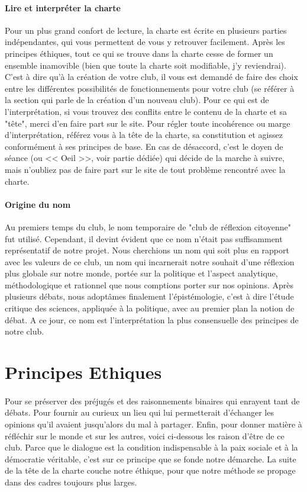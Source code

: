 \documentclass[a4paper,12pt]{article}
\begin{document}
\paragraph{Lire et interpréter la charte}
Pour un plus grand confort de lecture, la charte est écrite en plusieurs parties indépendantes, qui vous permettent de vous y retrouver facilement. Après les principes éthiques, tout ce qui se trouve dans la charte cesse de former un ensemble inamovible (bien que toute la charte soit modifiable, j'y reviendrai). C'est à dire qu'à la création de votre club, il vous est demandé de faire des choix entre les différentes possibilités de fonctionnements pour votre club (se référer à la section qui parle de la création d'un nouveau club). Pour ce qui est de l'interprétation, si vous trouvez des conflits entre le contenu de la charte et sa "tête", merci d'en faire part sur le site. Pour régler toute incohérence ou marge d'interprétation, référez vous à la tête de la charte, sa constitution et agissez conformément à ses principes de base. En cas de désaccord, c'est le doyen de séance (ou << Oeil >>, voir partie dédiée) qui décide de la marche à suivre, mais n'oubliez pas de faire part sur le site de tout problème rencontré avec la charte.

\paragraph{Origine du nom}
Au premiers temps du club, le nom temporaire de "club de réflexion citoyenne" fut utilisé. Cependant, il devint évident que ce nom n'était pas suffisamment représentatif de notre projet. Nous cherchions un nom qui soit plus en rapport avec les valeurs de ce club, un nom qui incarnerait notre souhait d'une réflexion plus globale sur notre monde, portée sur la politique et l'aspect analytique, méthodologique et rationnel que nous comptions porter sur nos opinions. Après plusieurs débats, nous adoptâmes finalement l'épistémologie, c'est à dire l'étude critique des sciences, appliquée à la politique, avec au premier plan la notion de débat. A ce jour, ce nom est l'interprétation la plus consensuelle des principes de notre club.
  
\section{Principes Ethiques}
\paragraph{} 
Pour se préserver des préjugés et des raisonnements binaires qui enrayent tant de débats. Pour fournir au curieux un lieu qui lui permetterait d'échanger les opinions qu'il avaient jusqu'alors du mal à partager. Enfin, pour donner matière à réfléchir sur le monde et sur les autres, voici ci-dessous les raison d'être de ce club. Parce que le dialogue est la condition indispensable à la paix sociale et à la démocratie véritable, c'est sur ce principe que se fonde notre démarche. La suite de la tête de la charte couche notre éthique, pour que notre méthode se propage dans des cadres toujours plus larges.
\end{document}
